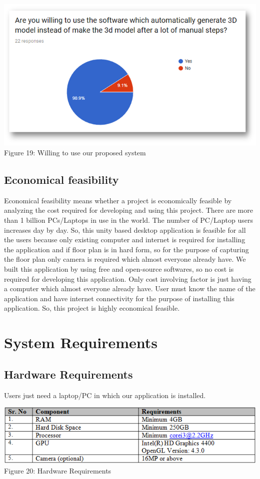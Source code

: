\documentclass{article}
\begin{document}
\begin{center}
\includegraphics[scale=0.6]{lastgraph}
\\Figure 19: Willing to use our proposed system
\end{center}
 

\subsection{Economical feasibility}

Economical feasibility means whether a project is economically feasible by analyzing the cost required for developing and using this project. There are more than 1 billion PCs/Laptops in use in the world. The number of PC/Laptop users increases day by day. So, this unity based desktop application is feasible for all the users because only existing computer and internet is required for installing the application and if floor plan is in hard form, so for the purpose of capturing  the floor plan only camera is required which almost everyone already have. We built this application by using free and open-source softwares, so no cost is required for developing this application. Only cost involving factor is just having a computer which almost everyone already have. User must know the name of the application and have internet connectivity for the purpose of installing this application. So, this project is highly economical feasible.\cite{econFeas}\\

\section{System Requirements}
\subsection{Hardware Requirements}
Users just need a laptop/PC in which our application is installed.
\begin{center}
\includegraphics[scale=0.8]{table2}
\\Figure 20: Hardware Requirements
\end{center}
\end{document}
